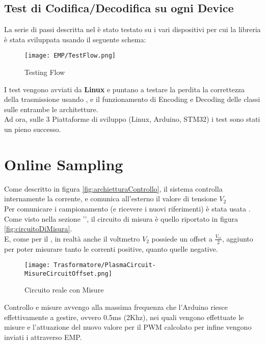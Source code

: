 \subsection{Test di Codifica/Decodifica su ogni Device}
La serie di passi descritta nel  è stato testato su i vari dispositivi per cui la libreria è stata sviluppata usando il seguente schema:
\begin{figure}[H]
	\centering
	\caption[EMP Benchmark Testing Flow]{Testing Flow}
	\texttt{[image: EMP/TestFlow.png]}
\end{figure}

\noindent
I test vengono avviati da \textbf{Linux} e puntano a testare la perdita la correttezza della trasmissione usando , e il funzionamento di Encoding e Decoding delle classi sulle entrambe le architetture.\\
Ad ora, sulle 3 Piattaforme di sviluppo (Linux, Arduino, STM32) i test sono stati un pieno successo.

\newpage
\section{Online Sampling}
Come descritto in figura \ref{fig:archietturaControllo}, il sistema controlla internamente la corrente, e comunica all'esterno il valore di tensione $ V_2 $ \\
Per comunicare i campionamento (e ricevere i nuovi riferimenti) è stata usata \cite*{EMP}.\\
Come visto nella sezione '', il circuito di misura è quello riportato in figura \ref{fig:circuitoDiMisura}.\\
E, come per il , in realtà anche il voltmetro $V_2$ possiede un offset a $\frac{V_{cc}}{2}$, aggiunto per poter misurare tanto le correnti positive, quanto quelle negative.\vspace{-2mm}
\begin{figure}[H]
	\centering
	\caption[Circuito equivalente del Plasma con l'offset delle Misure]{Circuito reale con Misure}\vspace{2mm}
	\texttt{[image: Trasformatore/PlasmaCircuit-MisureCircuitOffset.png]}
\end{figure}
\noindent
Controllo e misure avvengo alla massima frequenza che l'Arduino riesce effettivamente a gestire, ovvero 0.5ms (2Khz), nei quali vengono effettuate le misure e l'attuazione del nuovo valore per il PWM calcolato per infine vengono inviati i attraverso EMP.

